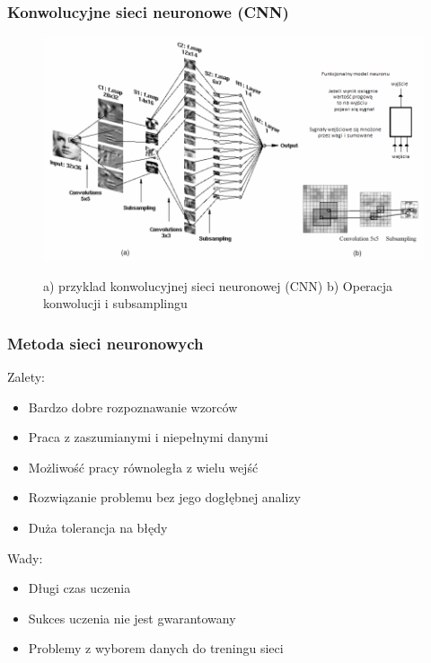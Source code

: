 \documentclass[xcolor=table]{beamer}
\begin{document}
\begin{frame}
  \frametitle{Konwolucyjne sieci neuronowe (CNN)}

	\begin{figure}
    		 {\includegraphics[scale=0.4]{cnn.png}}
		\caption{a) przyklad konwolucyjnej sieci neuronowej (CNN) b) Operacja konwolucji i subsamplingu}
	\end{figure}

\end{frame}

\begin{frame}
  \frametitle{Metoda sieci neuronowych}

 { 
	Zalety:
	\begin{itemize}
		\item Bardzo dobre rozpoznawanie wzorców
		\item Praca z zaszumianymi i niepełnymi danymi
		\item Możliwość pracy równoległa z wielu wejść
		\item Rozwiązanie problemu bez jego dogłębnej analizy
		\item Duża tolerancja na błędy
	\end{itemize}
}

\vspace{10pt}
 {
	Wady:
	\begin{itemize}
	\item  Długi czas uczenia
	\item Sukces uczenia nie jest gwarantowany
	\item Problemy z wyborem danych do treningu sieci
	\end{itemize}
}
\end{frame}
\end{document}
